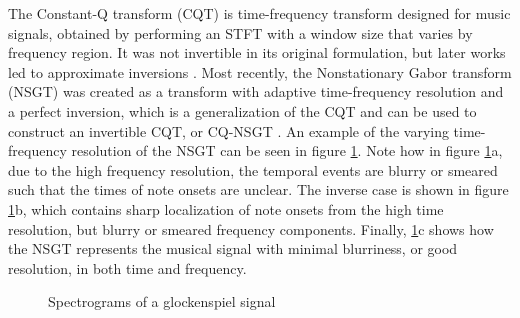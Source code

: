 \documentclass[letter,12pt,notitlepage]{article}
\begin{document}
The Constant-Q transform (CQT) \cite{jbrown} is time-frequency transform designed for music signals, obtained by performing an STFT with a window size that varies by frequency region. It was not invertible in its original formulation, but later works led to approximate inversions \cite{klapuricqt, fitzgeraldcqt}. Most recently, the Nonstationary Gabor transform (NSGT) \cite{balazs} was created as a transform with adaptive time-frequency resolution and a perfect inversion, which is a generalization of the CQT and can be used to construct an invertible CQT, or CQ-NSGT \cite{invertiblecqt}. An example of the varying time-frequency resolution of the NSGT can be seen in figure \ref{fig:nsgttradeoff}. Note how in figure \ref{fig:nsgttradeoff}a, due to the high frequency resolution, the temporal events are blurry or smeared such that the times of note onsets are unclear. The inverse case is shown in figure \ref{fig:nsgttradeoff}b, which contains sharp localization of note onsets from the high time resolution, but blurry or smeared frequency components. Finally, \ref{fig:nsgttradeoff}c shows how the NSGT represents the musical signal with minimal blurriness, or good resolution, in both time and frequency.

\begin{figure}[ht]
	\centering
	\label{subfig:blurrytime}
	\hspace{0.1em}
	\label{subfig:blurryfrequency}
	\hspace{0.1em}
	\caption{Spectrograms of a glockenspiel signal}
	\label{fig:nsgttradeoff}
\end{figure}
\end{document}
